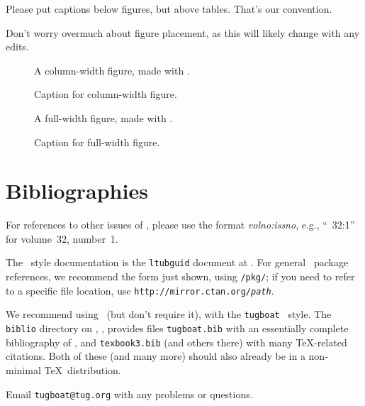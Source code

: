 \documentclass{ltugboat}
\begin{document}
Please put captions below figures, but above tables. That's our
convention.

Don't worry overmuch about figure placement, as this will likely change
with any edits.

\begin{figure}
A column-width figure, made with .
\caption{Caption for column-width figure.}
\label{fig.colwidth}
\end{figure}

\begin{figure*}
A full-width figure, made with .
\caption{Caption for full-width figure.}
\label{fig.fullwidth}
\end{figure*}

\section{Bibliographies}

For references to other issues of \TUB, please use the format
\textsl{volno:issno}, e.g., ``\TUB\ 32:1'' for volume~32, number~1.

The \TUB\ style documentation is the \texttt{ltubguid} document at
. For general \CTAN\ package references, we
recommend the form just shown, using \texttt{/pkg/}; if you need to
refer to a specific file location, use
\texttt{http://mirror.ctan.org/\textsl{path}}.

We recommend using \BibTeX\ (but don't require it), with the
\texttt{tugboat} \BibTeX\ style. The \texttt{biblio} directory on \CTAN,
, provides files \texttt{tugboat.bib} with
an essentially complete bibliography of \TUB, and \texttt{texbook3.bib}
(and others there) with many \TeX-related citations. Both of these (and
many more) should also already be in a non-minimal \TeX\ distribution.

Email \verb|tugboat@tug.org| with any problems or questions.


\nocite{book-minimal}      %

\makesignature
\end{document}
